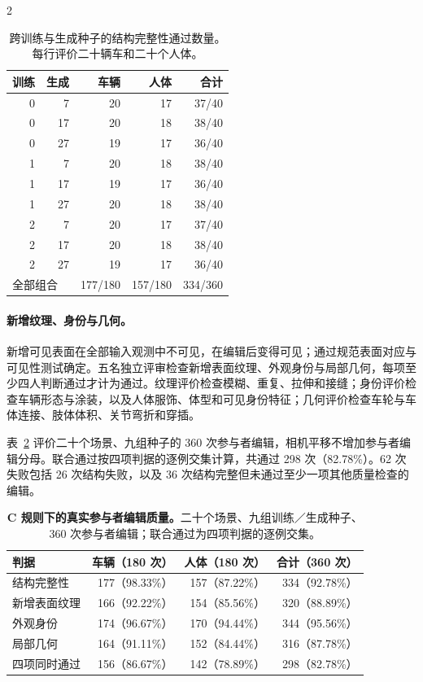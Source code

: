 \begin{multicols}{2}
\begin{table}[H]
\centering\small
\caption{跨训练与生成种子的结构完整性通过数量。每行评价二十辆车和二十个人体。}
\label{tab:edit-seeds}
\begin{tabular}{@{}rrrrr@{}}
\toprule
训练 & 生成 & 车辆 & 人体 & 合计 \\
\midrule
0 & 7 & 20 & 17 & 37/40 \\
0 & 17 & 20 & 18 & 38/40 \\
0 & 27 & 19 & 17 & 36/40 \\
1 & 7 & 20 & 18 & 38/40 \\
1 & 17 & 19 & 17 & 36/40 \\
1 & 27 & 20 & 18 & 38/40 \\
2 & 7 & 20 & 17 & 37/40 \\
2 & 17 & 20 & 18 & 38/40 \\
2 & 27 & 19 & 17 & 36/40 \\
\midrule
\multicolumn{2}{l}{全部组合} & 177/180 & 157/180 & 334/360 \\
\bottomrule
\end{tabular}
\end{table}

\paragraph{新增纹理、身份与几何。}
新增可见表面在全部输入观测中不可见，在编辑后变得可见；通过规范表面对应与可见性测试确定。五名独立评审检查新增表面纹理、外观身份与局部几何，每项至少四人判断通过才计为通过。纹理评价检查模糊、重复、拉伸和接缝；身份评价检查车辆形态与涂装，以及人体服饰、体型和可见身份特征；几何评价检查车轮与车体连接、肢体体积、关节弯折和穿插。

表~\ref{tab:real-edit-quality} 评价二十个场景、九组种子的 360 次参与者编辑，相机平移不增加参与者编辑分母。联合通过按四项判据的逐例交集计算，共通过 298 次（82.78\%）。62 次失败包括 26 次结构失败，以及 36 次结构完整但未通过至少一项其他质量检查的编辑。

\end{multicols}
\begin{table}[H]
\centering\small
\caption{\textbf{C 规则下的真实参与者编辑质量。}二十个场景、九组训练／生成种子、360 次参与者编辑；联合通过为四项判据的逐例交集。}
\label{tab:real-edit-quality}
\begin{tabular}{@{}lrrr@{}}
\toprule
判据 & 车辆（180 次） & 人体（180 次） & 合计（360 次）\\
\midrule
结构完整性 & 177（98.33\%） & 157（87.22\%） & 334（92.78\%）\\
新增表面纹理 & 166（92.22\%） & 154（85.56\%） & 320（88.89\%）\\
外观身份 & 174（96.67\%） & 170（94.44\%） & 344（95.56\%）\\
局部几何 & 164（91.11\%） & 152（84.44\%） & 316（87.78\%）\\
四项同时通过 & 156（86.67\%） & 142（78.89\%） & 298（82.78\%）\\
\bottomrule
\end{tabular}
\end{table}
